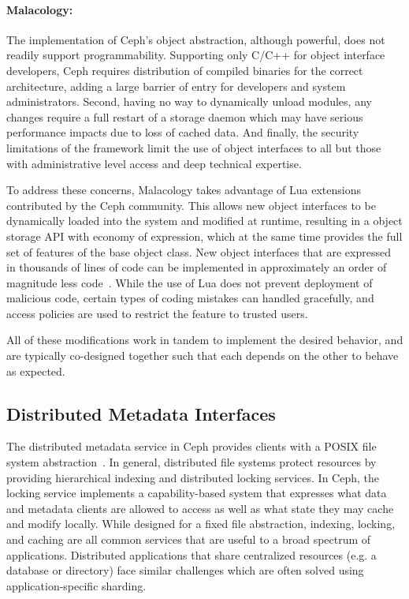\documentclass[preprint]{sigplanconf-eurosys}
\begin{document}
\paragraph*{Malacology:} The implementation of Ceph's object abstraction,
although powerful, does not readily support programmability. Supporting only
C/C++ for object interface developers, Ceph requires distribution of compiled
binaries for the correct architecture, adding a large barrier of entry for
developers and system administrators. Second, having no way to dynamically
unload modules, any changes require a full restart of a storage daemon which
may have serious performance impacts due to loss of cached data. And finally,
the security limitations of the framework limit the use of object interfaces to
all but those with administrative level access and deep technical expertise.

To address these concerns, Malacology takes advantage of Lua extensions
contributed by the Ceph community. This allows new object interfaces to be
dynamically loaded into the system and modified at runtime, resulting in a
object storage API with economy of expression, which at the same time provides
the full set of features of the base object class. New object interfaces that
are expressed in thousands of lines of code can be implemented in approximately
an order of magnitude less code~\cite{geambasu_comet_2010}. While the use of
Lua does not prevent deployment of malicious code, certain types of coding
mistakes can handled gracefully, and access policies are used to restrict the
feature to trusted users.

All of these modifications work in tandem to implement the desired behavior,
and are typically co-designed together such that each depends on the other to
behave as expected. 

\subsection{Distributed Metadata Interfaces}
\label{malacology:mds}

The distributed metadata service in Ceph provides clients with a POSIX file
system abstraction~\cite{weil:sc2004-dyn-metadata}. In general, distributed
file systems protect resources by providing hierarchical indexing and
distributed locking services.  In Ceph, the locking service implements a
capability-based system that expresses what data and metadata clients are
allowed to access as well as what state they may cache and modify locally.
While designed for a fixed file abstraction, indexing, locking, and caching are
all common services that are useful to a broad spectrum of applications.
Distributed applications that share centralized resources (e.g. a database or
directory) face similar challenges which are often solved using
application-specific sharding. 
\end{document}
